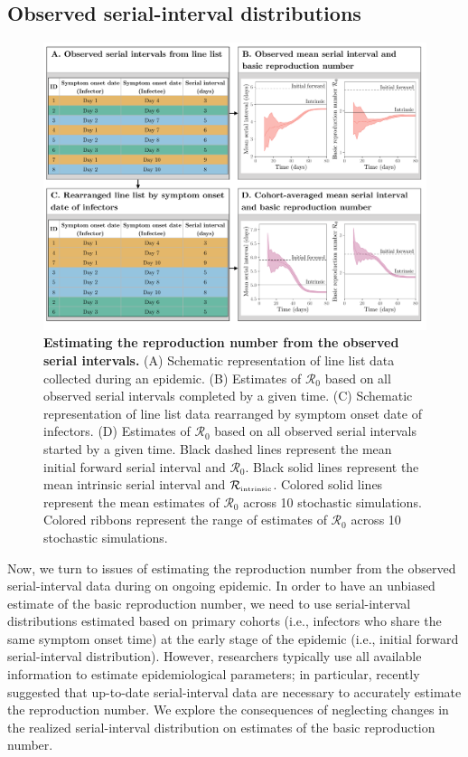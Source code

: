 \documentclass[12pt]{article}
\newcommand{\Rx}[1]{\ensuremath{{\mathcal R}_{#1}}\xspace}
\newcommand{\Ro}{\Rx{0}}
\newcommand{\Rintrinsic}{\ensuremath{{\mathcal R}_{\textrm{\tiny intrinsic}}}\xspace}
\begin{document}
\subsection{Observed serial-interval distributions}

\begin{figure}[!ht]
\includegraphics[width=\textwidth]{diagram.pdf}
\caption{
\textbf{Estimating the reproduction number from the observed serial intervals.}
(A) Schematic representation of line list data collected during an epidemic.
(B) Estimates of \Ro based on all observed serial intervals completed by a given time.
(C) Schematic representation of line list data rearranged by symptom onset date of infectors.
(D) Estimates of \Ro based on all observed serial intervals started by a given time. 
Black dashed lines represent the mean initial forward serial interval and \Ro.
Black solid lines represent the mean intrinsic serial interval and \Rintrinsic.
Colored solid lines represent the mean estimates of \Ro across 10 stochastic simulations.
Colored ribbons represent the range of estimates of \Ro across 10 stochastic simulations.
}
\label{fig:obsrR}
\end{figure}

Now, we turn to issues of estimating the reproduction number from the observed serial-interval data during on ongoing epidemic.
In order to have an unbiased estimate of the basic reproduction number, we need to use serial-interval distributions estimated based on primary cohorts (i.e., infectors who share the same symptom onset time) at the early stage of the epidemic (i.e., initial forward serial-interval distribution).
However, researchers typically use all available information to estimate epidemiological parameters;
in particular, \cite{thompson2019improved} recently suggested that up-to-date serial-interval data are necessary to accurately estimate the reproduction number.
We explore the consequences of neglecting changes in the realized serial-interval distribution on estimates of the basic reproduction number.
\end{document}
